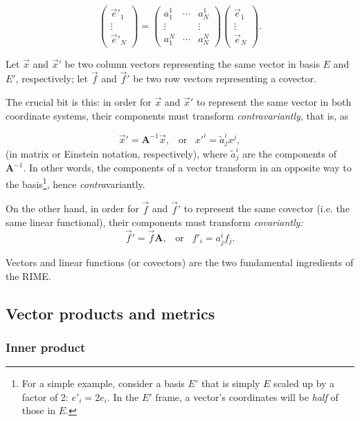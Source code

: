 \documentclass[]{aa}
\begin{document}
\[
    \left( \begin{array}{c} \vec e'_1 \\ \vdots \\ \vec e'_N \end{array} \right ) = 
    \left( \begin{array}{ccc} 
      a^1_1 & \cdots & a^1_N \\
      \vdots & & \vdots \\
      a^N_1 & \cdots & a^N_N 
    \end{array} \right )  
    \left( \begin{array}{c} \vec e_1 \\ \vdots \\ \vec e_N \end{array}  \right ).
\]



Let $\vec x$ and $\vec x'$ be two column vectors representing the same vector in basis $E$ and $E'$, respectively; let $\vec f$ and $\vec f'$ be two row vectors representing a covector.

The crucial bit is this: in order for $\vec x$ and $\vec x'$ to represent the same vector in both coordinate systems, their components must transform \emph{contravariantly}, that is, as

\[
  \vec x' = \mathbf{A}^{-1} \vec x,\;\;\;\mbox{or}\;\;\;x'^i = \tilde a^i_j x^j,
\]
(in matrix or Einstein notation, respectively), where $\tilde a^i_j$ are the components of $\mathbf{A}^{-1}.$ In other words, the components of a vector transform in an opposite way to the basis\footnote{For a simple example, consider a basis $E'$ that is simply $E$ scaled up by a factor of 2: $e'_i = 2e_i$. In the $E'$ frame, a vector's coordinates will be {\em half} of those in $E$.}, hence \emph{contra\/}variantly.

On the other hand, in order for $\vec f$ and $\vec f'$ to represent the same covector (i.e. the same linear functional), their components must transform \emph{covariantly:}
\[
  \vec f' = \vec f \mathbf{A},\;\;\;\mbox{or}\;\;\;f'_i = a^i_j f_j.
\]

Vectors and linear functions (or covectors) are the two fundamental ingredients of the RIME.

\subsection{Vector products and metrics}

\subsubsection{Inner product}
\label{sec:inner-prod}
\end{document}

